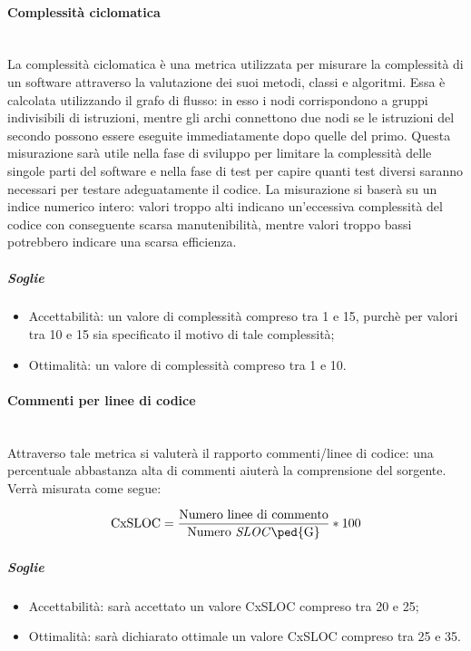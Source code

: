 \paragraph{Complessità ciclomatica}
	~\\La complessità ciclomatica è una metrica utilizzata per misurare la complessità di un software attraverso la valutazione dei suoi metodi, classi e algoritmi. Essa è calcolata utilizzando il grafo di flusso: in esso i nodi corrispondono a gruppi indivisibili di istruzioni, mentre gli archi connettono due nodi se le istruzioni del secondo possono essere eseguite immediatamente dopo quelle del primo.
Questa misurazione sarà utile nella fase di sviluppo per limitare la complessità delle singole parti del software e nella fase di test per capire quanti test diversi saranno necessari per testare adeguatamente il codice.
La misurazione si baserà su un indice numerico intero: valori troppo alti indicano un'eccessiva complessità del codice con conseguente scarsa manutenibilità, mentre valori troppo bassi potrebbero indicare una scarsa efficienza.

\subparagraph{Soglie}
	\begin{itemize}
	\item Accettabilità: un valore di complessità compreso tra 1 e 15, purchè per valori tra 10 e 15 sia specificato il motivo di tale complessità;
 	\item Ottimalità: un valore di complessità compreso tra 1 e 10.
	\end{itemize}

\paragraph{Commenti per linee di codice}
	~\\Attraverso tale metrica si valuterà il rapporto commenti/linee di codice: una percentuale abbastanza alta di commenti aiuterà la comprensione del sorgente. Verrà misurata come segue:

	\begin{displaymath}
		\mbox{CxSLOC} =\frac{\mbox{Numero linee di commento}}{\mbox{Numero \emph{SLOC}\ped{G}}} * 100
	\end{displaymath}

\subparagraph{Soglie}
	\begin{itemize}
	\item Accettabilità: sarà accettato un valore CxSLOC compreso tra 20 e 25;
	\item Ottimalità: sarà dichiarato ottimale un valore CxSLOC compreso tra 25 e 35.
	\end{itemize}

